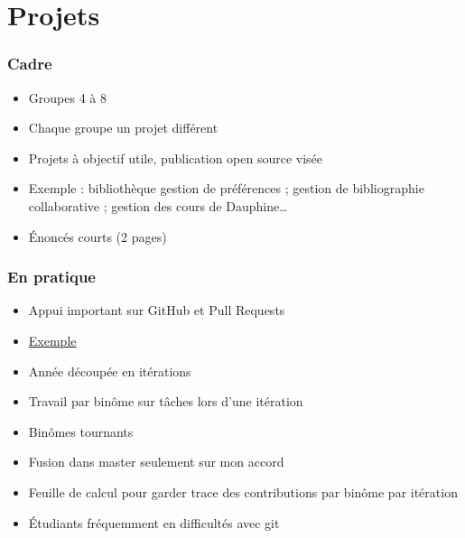 \documentclass[french]{beamer}
\begin{document}
\section{Projets}
\begin{frame}
	\frametitle{Cadre}
	\begin{itemize}
		\item Groupes 4 à 8
		\item Chaque groupe un projet différent
		\item Projets à objectif utile, publication open source visée
		\item Exemple : bibliothèque gestion de préférences ; gestion de bibliographie collaborative ; gestion des cours de Dauphine…
		\item Énoncés courts (2 pages)
	\end{itemize}
\end{frame}

\begin{frame}
	\frametitle{En pratique}
	\begin{itemize}
		\item Appui important sur GitHub et Pull Requests
		\item \href{https://github.com/13tomoore/J-Confs/pull/5\#issuecomment-495630823}{Exemple}
		\item Année découpée en itérations
		\item Travail par binôme sur tâches lors d’une itération
		\item Binômes tournants
		\item Fusion dans master seulement sur mon accord
		\item Feuille de calcul pour garder trace des contributions par binôme par itération
		\item Étudiants fréquemment en difficultés avec git
	\end{itemize}
\end{frame}
\end{document}
